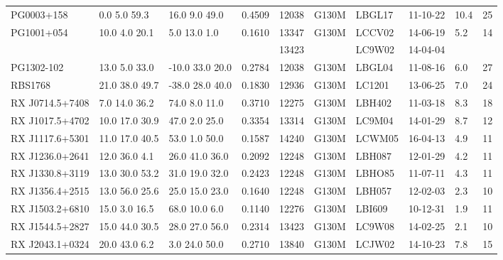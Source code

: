 \documentclass[twocolumn,tighten]{aastex6}
\begin{document}
\begin{table}[ht]
\begin{center}
\begin{tabular}{l l l l l l l l l l}
PG0003+158  		&     0.0  5.0  59.3   &     16.0  9.0  49.0    &    0.4509  & 12038  		    &   G130M  &   LBGL17  		& 11-10-22  		   & 10.4  &      25         \\
PG1001+054  		&    10.0  4.0  20.1  &       5.0  13.0  1.0    &    0.1610  & 13347		    &   G130M  &   LCCV02 		& 14-06-19  		   &  5.2   &      14         \\
				&			      &				       &		 & 13423		    &		      &   LC9W02		& 14-04-04		   &	       &	  	   \\
PG1302-102  		&    13.0  5.0  33.0  &    -10.0  33.0  20.0  &   0.2784  & 12038  		    &   G130M  &   LBGL04  		& 11-08-16  		   &  6.0   &      27         \\
RBS1768  		&  21.0  38.0  49.7  &    -38.0  28.0  40.0  &   0.1830  & 12936  		    &   G130M  &   LC1201 		& 13-06-25		   &  7.0   &      24         \\
RX J0714.5+7408  &     7.0  14.0  36.2  &      74.0  8.0  11.0   &   0.3710  & 12275  		    &   G130M  &   LBH402   		& 11-03-18   		   &  8.3   &      18         \\
RX J1017.5+4702  &   10.0  17.0  30.9  &      47.0  2.0  25.0   &   0.3354  & 13314  		    &   G130M  &   LC9M04		& 14-01-29		   &  8.7   &      12         \\
RX J1117.6+5301  &    11.0  17.0  40.5  &      53.0  1.0  50.0   &   0.1587  & 14240  		    &   G130M  &   LCWM05		& 16-04-13		   &  4.9   &      11         \\
RX J1236.0+2641  &     12.0  36.0  4.1  &    26.0  41.0  36.0   &   0.2092  & 12248  		    &   G130M  &   LBH087  		& 12-01-29  		   &  4.2   &      11         \\
RX J1330.8+3119  &   13.0  30.0  53.2  &    31.0  19.0  32.0   &   0.2423  & 12248  		    &   G130M  &   LBHO85  		& 11-07-11		   &   4.3  &      11         \\
RX J1356.4+2515  &   13.0  56.0  25.6  &    25.0  15.0  23.0   &   0.1640  & 12248  		    &   G130M  &   LBH057			& 12-02-03		   &   2.3  &      10         \\
RX J1503.2+6810  &     15.0  3.0  16.5  &    68.0  10.0  6.0     &   0.1140  & 12276  		    &   G130M  &   LBI609    		& 10-12-31 		   &   1.9  &      11         \\
RX J1544.5+2827  &   15.0  44.0  30.5  &   28.0  27.0  56.0    &   0.2314  & 13423  	            &   G130M  &   LC9W08		& 14-02-25		   &   2.1  &      10         \\
RX J2043.1+0324  &     20.0  43.0  6.2  &     3.0  24.0  50.0    &   0.2710  & 13840		    &   G130M  &   LCJW02		& 14-10-23		   &   7.8  &      15         \\

\end{tabular}
\end{center}
\end{table}
\end{document}
